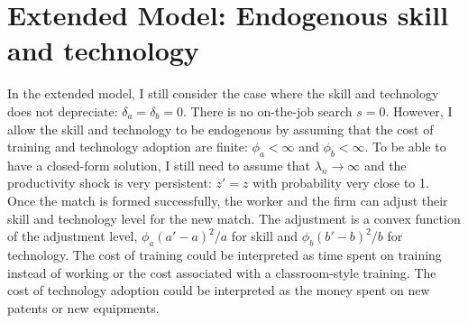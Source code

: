 \documentclass[12pt]{article}
\newcommand{\1}{\mathbb{1}}
\begin{document}
\section{Extended Model: Endogenous skill and technology}
In the extended model, I still consider the case where the skill and technology does not depreciate: $\delta_a = \delta_b = 0$. There is no on-the-job search $s=0$. However, I allow the skill and technology to be endogenous by assuming that the cost of training and technology adoption are finite: $\phi_a<\infty$ and $\phi_b<\infty$. To be able to have a closed-form solution, I still need to assume that $\lambda_n \to \infty$ and the productivity shock is very persistent: $z' = z$ with probability very close to 1. \\

Once the match is formed successfully, the worker and the firm can adjust their skill and technology level for the new match. The adjustment is a convex function of the adjustment level, $\phi_a(a'-a)^2/a$ for skill and $\phi_b(b'-b)^2/b$ for technology. The cost of training could be interpreted as time spent on training instead of working or the cost associated with a classroom-style training. The cost of technology adoption could be interpreted as the money spent on new patents or new equipments. 
\end{document}
